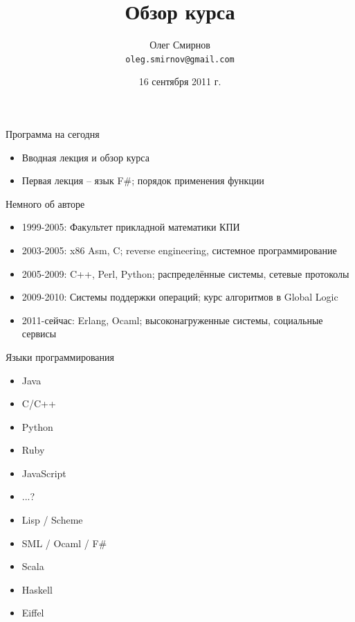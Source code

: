 \documentclass{beamer}
\title[Введение в функциональное программирование]{Обзор курса}
\author{Олег Смирнов\\
\texttt{oleg.smirnov@gmail.com}}
\institute{УНК ``ИПСА'' НТУУ ``КПИ''}
\date{16 сентября 2011 г.}
\begin{document}
\begin{frame}
\titlepage
\end{frame}

\begin{frame}{Программа на сегодня}
  \begin{itemize}
    \item Вводная лекция и обзор курса
    \item Первая лекция -- язык F\#; порядок применения функции
  \end{itemize}
\end{frame}

\begin{frame}{Немного об авторе}
  \begin{itemize}
  \item 1999-2005: Факультет прикладной математики КПИ
  \item 2003-2005: x86 Asm, C; reverse engineering, системное программирование
  \item 2005-2009: C++, Perl, Python; распределённые системы, сетевые протоколы
  \item 2009-2010: Системы поддержки операций; курс алгоритмов в Global Logic
  \item 2011-сейчас: Erlang, Ocaml; высоконагруженные системы, социальные сервисы
  \end{itemize}
\end{frame}

\begin{frame}{Языки программирования}
  \begin{minipage}{0.49\linewidth}
    \begin{itemize}
    \item Java
    \item C/C++
    \item Python
    \item Ruby
    \item JavaScript
    \item ...?
    \end{itemize}
  \end{minipage}
  \begin{minipage}{0.49\linewidth}
    \begin{itemize}
    \item Lisp / Scheme
    \item SML / Ocaml / F\#
    \item Scala
    \item Haskell
    \item Eiffel
    \end{itemize}
  \end{minipage}
\end{frame}
\end{document}
